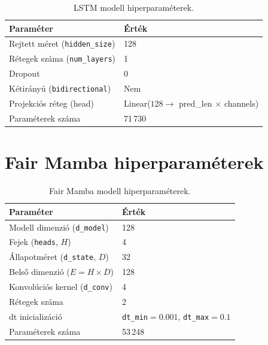 \begin{table}[H]
    \centering
    \begin{tabular}{|l|l|}
        \hline
        \textbf{Paraméter} & \textbf{Érték} \\
        \hline\hline
        Rejtett méret (\texttt{hidden\_size}) & 128 \\
        Rétegek száma (\texttt{num\_layers})  & 1 \\
        Dropout                               & 0 \\
        Kétirányú (\texttt{bidirectional})    & Nem \\
        Projekciós réteg (head)               & Linear($128 \to$ pred\_len $\times$ channels) \\
        Paraméterek száma                     & 71\,730 \\
        \hline
    \end{tabular}
    \caption{LSTM modell hiperparaméterek.}
    \label{tab:app_lstm}
\end{table}

\section{Fair Mamba hiperparaméterek}

\begin{table}[H]
    \centering
    \begin{tabular}{|l|l|}
        \hline
        \textbf{Paraméter} & \textbf{Érték} \\
        \hline\hline
        Modell dimenzió (\texttt{d\_model})    & 128 \\
        Fejek (\texttt{heads}, $H$)            & 4 \\
        Állapotméret (\texttt{d\_state}, $D$)  & 32 \\
        Belső dimenzió ($E = H \times D$)      & 128 \\
        Konvolúciós kernel (\texttt{d\_conv})  & 4 \\
        Rétegek száma                          & 2 \\
        dt inicializáció                       & \texttt{dt\_min}$=0.001$, \texttt{dt\_max}$=0.1$ \\
        Paraméterek száma                      & 53\,248 \\
        \hline
    \end{tabular}
    \caption{Fair Mamba modell hiperparaméterek.}
    \label{tab:app_fair}
\end{table}

